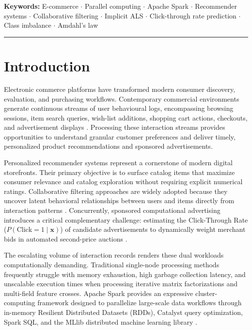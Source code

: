 \documentclass[10pt,a4paper,twoside]{article}
\begin{document}
\noindent\textbf{Keywords:} E-commerce $\cdot$ Parallel computing $\cdot$ Apache Spark $\cdot$ Recommender systems $\cdot$ Collaborative filtering $\cdot$ Implicit ALS $\cdot$ Click-through rate prediction $\cdot$ Class imbalance $\cdot$ Amdahl's law

\vspace{0.8em}
\hrule
\vspace{1em}

\section{Introduction}
Electronic commerce platforms have transformed modern consumer discovery, evaluation, and purchasing workflows. Contemporary commercial environments generate continuous streams of user behavioural logs, encompassing browsing sessions, item search queries, wish-list additions, shopping cart actions, checkouts, and advertisement displays \cite{zhou2018deep}. Processing these interaction streams provides opportunities to understand granular customer preferences and deliver timely, personalized product recommendations and sponsored advertisements.

Personalized recommender systems represent a cornerstone of modern digital storefronts. Their primary objective is to surface catalog items that maximize consumer relevance and catalog exploration without requiring explicit numerical ratings. Collaborative filtering approaches are widely adopted because they uncover latent behavioral relationships between users and items directly from interaction patterns \cite{sarwar2001item,hu2008collaborative}. Concurrently, sponsored computational advertising introduces a critical complementary challenge: estimating the Click-Through Rate ($P(\text{Click} = 1 \mid \mathbf{x})$) of candidate advertisements to dynamically weight merchant bids in automated second-price auctions \cite{he2014practical,mcmahan2013ad}.

The escalating volume of interaction records renders these dual workloads computationally demanding. Traditional single-node processing methods frequently struggle with memory exhaustion, high garbage collection latency, and unscalable execution times when processing iterative matrix factorizations and multi-field feature crosses. Apache Spark provides an expressive cluster-computing framework designed to parallelize large-scale data workflows through in-memory Resilient Distributed Datasets (RDDs), Catalyst query optimization, Spark SQL, and the MLlib distributed machine learning library \cite{armbrust2015spark,zaharia2016apache}.
\end{document}
